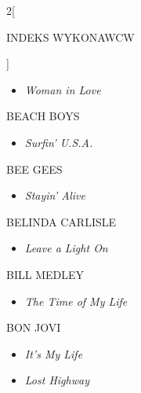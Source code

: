\documentclass[a4paper]{report}
\begin{document}
\begin{multicols*}{2}[\begin{Huge}INDEKS WYKONAWCW\end{Huge}\vspace{1cm}]
\begin{minipage}{\columnwidth}
\begin{itemize}[topsep=3pt, after=\vspace{3mm}]
		\item[]  \textit{Woman in Love}  \\
	\end{itemize}
\end{minipage}
\begin{minipage}{\columnwidth}
	BEACH BOYS 
	\begin{itemize}[topsep=3pt, after=\vspace{3mm}]
		\itemsep0em
		\item[]\textit{Surfin' U.S.A.}  \\
	\end{itemize}
\end{minipage}
\begin{minipage}{\columnwidth}
	BEE GEES 
	\begin{itemize}[topsep=3pt, after=\vspace{3mm}]
		\itemsep0em
		\item[]\textit{Stayin' Alive}  \\
	\end{itemize}
\end{minipage}
\begin{minipage}{\columnwidth}
	BELINDA CARLISLE 
	\begin{itemize}[topsep=3pt, after=\vspace{3mm}]
		\itemsep0em
		\item[]\textit{Leave a Light On}  \\
	\end{itemize}
\end{minipage}
\begin{minipage}{\columnwidth}
	BILL MEDLEY 
	\begin{itemize}[topsep=3pt, after=\vspace{3mm}]
		\itemsep0em
		\item[]\textit{The Time of My Life}  \\
	\end{itemize}
\end{minipage}
\begin{minipage}{\columnwidth}
	BON JOVI 
	\begin{itemize}[topsep=3pt, after=\vspace{3mm}]
		\itemsep0em
		\item[]\textit{It's My Life}  \\
		\item[]  \textit{Lost Highway}  \\
	\end{itemize}

\end{minipage}
\end{multicols*}
\end{document}
